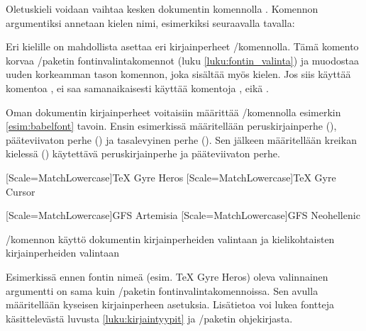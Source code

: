 \begin{koodilohkosis}
\end{koodilohkosis}

Oletuskieli voidaan vaihtaa kesken dokumentin komennolla . Komennon argumentiksi annetaan kielen nimi,
esimerkiksi seuraavalla tavalla:

\begin{koodilohkosis}
\end{koodilohkosis}

Eri kielille on mahdollista asettaa eri kirjainperheet \-/komennolla. Tämä komento korvaa
\-/paketin fontinvalintakomennot (luku
\ref{luku:fontin_valinta}) ja muodostaa uuden korkeamman tason komennon,
joka sisältää myös kielen. Jos siis käyttää komentoa , ei saa samanaikaisesti käyttää komentoja ,  eikä .

Oman dokumentin kirjainperheet voitaisiin määrittää \-/komennolla esimerkin \ref{esim:babelfont} tavoin. Ensin
esimerkissä määritellään peruskirjainperhe (), pääteviivaton
perhe () ja tasalevyinen perhe (). Sen jälkeen
määritellään kreikan kielessä () käytettävä
peruskirjainperhe ja pääteviivaton perhe.

\begin{esimerkki*}
\begin{koodilohko}
  [Scale=MatchLowercase]{TeX Gyre Heros}
  [Scale=MatchLowercase]{TeX Gyre Cursor}

  [Scale=MatchLowercase]{GFS Artemisia}
  [Scale=MatchLowercase]{GFS Neohellenic}
\end{koodilohko}
\caption{\-/komennon käyttö dokumentin
  kirjainperheiden valintaan ja kielikohtaisten kirjainperheiden
  valintaan}
\label{esim:babelfont}
\end{esimerkki*}

Esimerkissä ennen fontin nimeä (esim. TeX Gyre Heros) oleva valinnainen
argumentti on sama kuin \-/paketin
fontinvalintakomennoissa. Sen avulla määritellään kyseisen
kirjainperheen asetuksia. Lisätietoa voi lukea fontteja käsittelevästä
luvusta \ref{luku:kirjaintyypit} ja \-/paketin
ohjekirjasta.

